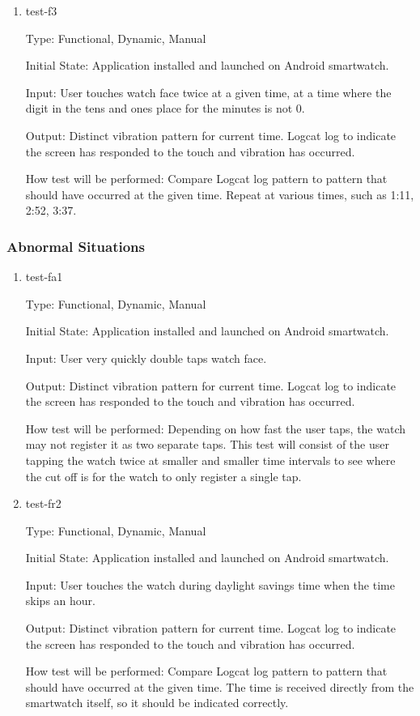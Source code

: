\begin{enumerate}
\item{test-f3\\}

Type: Functional, Dynamic, Manual
					
Initial State: Application installed and launched on Android smartwatch. 
					
Input: User touches watch face twice at a given time, at a time where the digit in the tens and ones place for the minutes is not 0.
					
Output: Distinct vibration pattern for current time. Logcat log to indicate the screen has responded to the touch and vibration has occurred.  
					
How test will be performed: Compare Logcat log pattern to pattern that should have occurred at the given time. Repeat at various times, such as 1:11, 2:52, 3:37. 

\end{enumerate}


\subsubsection{Abnormal Situations}

\begin{enumerate}

\item{test-fa1\\}

Type: Functional, Dynamic, Manual
					
Initial State: Application installed and launched on Android smartwatch. 
					
Input: User very quickly double taps watch face.
					
Output: Distinct vibration pattern for current time. Logcat log to indicate the screen has responded to the touch and vibration has occurred.
					
How test will be performed: Depending on how fast the user taps, the watch may not register it as two separate taps. This test will consist of the user tapping the watch twice at smaller and smaller time intervals to see where the cut off is for the watch to only register a single tap.
					
\item{test-fr2\\}

Type: Functional, Dynamic, Manual
					
Initial State: Application installed and launched on Android smartwatch. 
					
Input: User touches the watch during daylight savings time when the time skips an hour.
					
Output: Distinct vibration pattern for current time. Logcat log to indicate the screen has responded to the touch and vibration has occurred.
					
How test will be performed: Compare Logcat log pattern to pattern that should have occurred at the given time. The time is received directly from the smartwatch itself, so it should be indicated correctly.


\end{enumerate}

